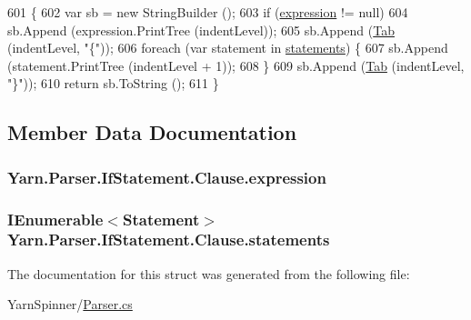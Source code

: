 \begin{DoxyCode}
601                                                            \{
602                     var sb = \textcolor{keyword}{new} StringBuilder ();
603                     \textcolor{keywordflow}{if} (\hyperlink{a00030_a1abd1f7c41f68ccdf64074ea49365be9}{expression} != null)
604                         sb.Append (expression.PrintTree (indentLevel));
605                     sb.Append (\hyperlink{a00123_aa8fa36b46de12a1c561d77b99c4b9ae3}{Tab} (indentLevel, \textcolor{stringliteral}{"\{"}));
606                     \textcolor{keywordflow}{foreach} (var statement \textcolor{keywordflow}{in} \hyperlink{a00030_a6f4765482e98ed042e38a0ede13f171f}{statements}) \{
607                         sb.Append (statement.PrintTree (indentLevel + 1));
608                     \}
609                     sb.Append (\hyperlink{a00123_aa8fa36b46de12a1c561d77b99c4b9ae3}{Tab} (indentLevel, \textcolor{stringliteral}{"\}"}));
610                     \textcolor{keywordflow}{return} sb.ToString ();
611                 \}
\end{DoxyCode}


\subsection{Member Data Documentation}
\hypertarget{a00030_a1abd1f7c41f68ccdf64074ea49365be9}{
\subsubsection[{expression}]{ Yarn.\-Parser.\-If\-Statement.\-Clause.\-expression\hspace{0.3cm}{\ttfamily [package]}}}\label{a00030_a1abd1f7c41f68ccdf64074ea49365be9}
\hypertarget{a00030_a6f4765482e98ed042e38a0ede13f171f}{
\subsubsection[{statements}]{\setlength{\rightskip}{0pt plus 5cm}I\-Enumerable$<${\bf Statement}$>$ Yarn.\-Parser.\-If\-Statement.\-Clause.\-statements\hspace{0.3cm}{\ttfamily [package]}}}\label{a00030_a6f4765482e98ed042e38a0ede13f171f}


The documentation for this struct was generated from the following file\-:\begin{DoxyCompactItemize}
\item 
Yarn\-Spinner/\hyperlink{a00269}{Parser.\-cs}\end{DoxyCompactItemize}
